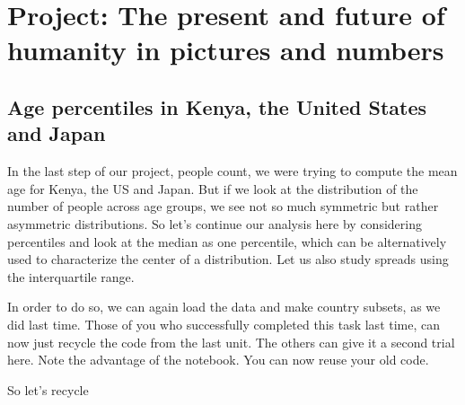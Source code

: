 \documentclass[letterpaper,10pt,english]{jupyterBook}
\begin{document}
\section{Project: The present and future of humanity in pictures and numbers}
\label{\detokenize{exercises_unit_3:project-the-present-and-future-of-humanity-in-pictures-and-numbers}}

\subsection{Age percentiles in Kenya, the United States and Japan}
\label{\detokenize{exercises_unit_3:age-percentiles-in-kenya-the-united-states-and-japan}}
\sphinxAtStartPar
In the last step of our project, people count, we were trying to
compute the mean age for Kenya, the US and Japan. But if we look
at the distribution of the number of people across age groups, we
see not so much symmetric but rather asymmetric distributions. So let’s
continue our analysis here by considering percentiles and
look at the median as one percentile, which can be alternatively
used to characterize the center of a distribution. Let us
also study spreads using the interquartile range.

\sphinxAtStartPar
In order to do so, we can again load the data and make country subsets,
as we did last time. Those of you who successfully completed this task
last time, can now just recycle the code from the last unit. The others
can give it a second trial here. Note the advantage of the notebook. You can now reuse your old code.

\sphinxAtStartPar
So let’s recycle
\end{document}

